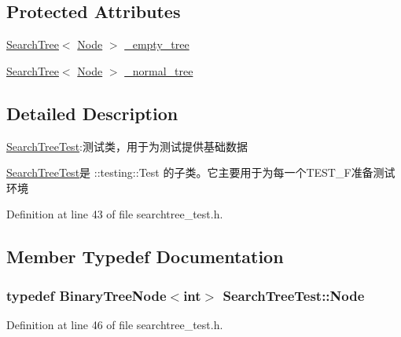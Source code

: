 \subsection*{Protected Attributes}
\begin{DoxyCompactItemize}
\item 
\hyperlink{class_introduction_to_algorithm_1_1_tree_algorithm_1_1_search_tree}{Search\+Tree}$<$ \hyperlink{class_search_tree_test_a921d5813f947eb9b70417b69722bc050}{Node} $>$ \hyperlink{class_search_tree_test_a08832932ab11e000dcd1ba60da8bad5f}{\+\_\+empty\+\_\+tree}
\item 
\hyperlink{class_introduction_to_algorithm_1_1_tree_algorithm_1_1_search_tree}{Search\+Tree}$<$ \hyperlink{class_search_tree_test_a921d5813f947eb9b70417b69722bc050}{Node} $>$ \hyperlink{class_search_tree_test_a9982df0c932b171ff29dfe7abcebdc05}{\+\_\+normal\+\_\+tree}
\end{DoxyCompactItemize}


\subsection{Detailed Description}
\hyperlink{class_search_tree_test}{Search\+Tree\+Test}\+:测试类，用于为测试提供基础数据 

{\ttfamily \hyperlink{class_search_tree_test}{Search\+Tree\+Test}}是 {\ttfamily \+::testing\+::\+Test} 的子类。它主要用于为每一个{\ttfamily T\+E\+S\+T\+\_\+\+F}准备测试环境 

Definition at line 43 of file searchtree\+\_\+test.\+h.



\subsection{Member Typedef Documentation}
\hypertarget{class_search_tree_test_a921d5813f947eb9b70417b69722bc050}{}
\subsubsection[{Node}]{\setlength{\rightskip}{0pt plus 5cm}typedef {\bf Binary\+Tree\+Node}$<$int$>$ {\bf Search\+Tree\+Test\+::\+Node}}\label{class_search_tree_test_a921d5813f947eb9b70417b69722bc050}


Definition at line 46 of file searchtree\+\_\+test.\+h.



